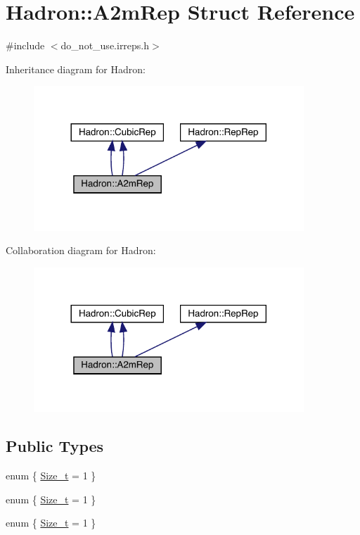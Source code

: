 \hypertarget{structHadron_1_1A2mRep}{}\section{Hadron\+:\+:A2m\+Rep Struct Reference}
\label{structHadron_1_1A2mRep}


{\ttfamily \#include $<$do\+\_\+not\+\_\+use.\+irreps.\+h$>$}



Inheritance diagram for Hadron\+:\nopagebreak
\begin{figure}[H]
\begin{center}
\leavevmode
\includegraphics[width=288pt]{de/d42/structHadron_1_1A2mRep__inherit__graph}
\end{center}
\end{figure}


Collaboration diagram for Hadron\+:\nopagebreak
\begin{figure}[H]
\begin{center}
\leavevmode
\includegraphics[width=288pt]{de/d8b/structHadron_1_1A2mRep__coll__graph}
\end{center}
\end{figure}
\subsection*{Public Types}
\begin{DoxyCompactItemize}
\item 
enum \{ \mbox{\hyperlink{structHadron_1_1A2mRep_adfb179d9e77593de0e7abdc79ea099c0a5e3da09ce3082c28664c38da1b8d6ac3}{Size\+\_\+t}} = 1
 \}
\item 
enum \{ \mbox{\hyperlink{structHadron_1_1A2mRep_adfb179d9e77593de0e7abdc79ea099c0a5e3da09ce3082c28664c38da1b8d6ac3}{Size\+\_\+t}} = 1
 \}
\item 
enum \{ \mbox{\hyperlink{structHadron_1_1A2mRep_adfb179d9e77593de0e7abdc79ea099c0a5e3da09ce3082c28664c38da1b8d6ac3}{Size\+\_\+t}} = 1
 \}
\end{DoxyCompactItemize}
